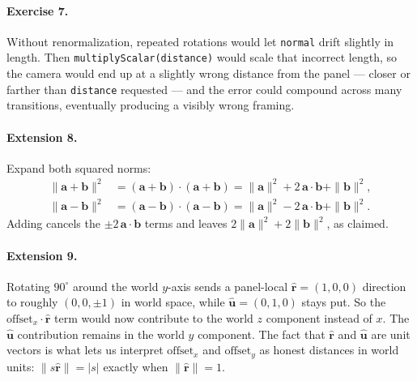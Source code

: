 \documentclass{article}
\begin{document}
\paragraph{Exercise 7.}
Without renormalization, repeated rotations would let \texttt{normal} drift
slightly in length. Then \texttt{multiplyScalar(distance)} would scale that
incorrect length, so the camera would end up at a slightly wrong distance
from the panel --- closer or farther than \texttt{distance} requested ---
and the error could compound across many transitions, eventually
producing a visibly wrong framing.

\paragraph{Extension 8.}
Expand both squared norms:
\begin{align*}
\|\mathbf{a}+\mathbf{b}\|^2 &= (\mathbf{a}+\mathbf{b})\cdot(\mathbf{a}+\mathbf{b})
  = \|\mathbf{a}\|^2 + 2\,\mathbf{a}\cdot\mathbf{b} + \|\mathbf{b}\|^2, \\
\|\mathbf{a}-\mathbf{b}\|^2 &= (\mathbf{a}-\mathbf{b})\cdot(\mathbf{a}-\mathbf{b})
  = \|\mathbf{a}\|^2 - 2\,\mathbf{a}\cdot\mathbf{b} + \|\mathbf{b}\|^2.
\end{align*}
Adding cancels the $\pm 2\,\mathbf{a}\cdot\mathbf{b}$ terms and leaves
$2\|\mathbf{a}\|^2 + 2\|\mathbf{b}\|^2$, as claimed.

\paragraph{Extension 9.}
Rotating $90^\circ$ around the world $y$-axis sends a panel-local
$\hat{\mathbf{r}} = (1,0,0)$ direction to roughly $(0, 0, \pm 1)$ in world
space, while $\hat{\mathbf{u}} = (0,1,0)$ stays put. So the
$\text{offset}_x \cdot \hat{\mathbf{r}}$ term would now contribute to the
world $z$ component instead of $x$. The $\hat{\mathbf{u}}$ contribution
remains in the world $y$ component. The fact that $\hat{\mathbf{r}}$ and
$\hat{\mathbf{u}}$ are unit vectors is what lets us interpret
$\text{offset}_x$ and $\text{offset}_y$ as honest distances in world units:
$\|s\hat{\mathbf{r}}\| = |s|$ exactly when $\|\hat{\mathbf{r}}\| = 1$.
\end{document}
